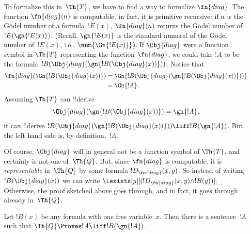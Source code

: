 \documentclass[../../../include/open-logic-section]{subfiles}
\begin{document}
\begin{explain}
To formalize this in~$\Th{T}$, we have to find a way to formalize
$\fn{diag}$. The function $\fn{diag}(n)$ is computable, in fact, it is
primitive recursive: if $n$ is the G\"odel number of a
formula~$!E(x)$, $\fn{diag}(n)$ returns the G\"odel number
of~$!E(\gn{!E(x)})$. (Recall, $\gn{!E(x)}$ is the standard numeral of
the G\"odel number of~$!E(x)$, i.e., $\num{\Gn{!E(x)}}$). If
$\Obj{diag}$ were a function symbol in $\Th{T}$ representing the
function $\fn{diag}$, we could take $!A$ to be the formula
$!B(\Obj{diag}(\gn{!B(\Obj{diag}(x))}))$. Notice that
\begin{align*}
\fn{diag}(\Gn{!B(\Obj{diag}(x))}) & = 
\Gn{!B(\Obj{diag}(\gn{!B(\Obj{diag}(x))}))} \\
& = \Gn{!A}.
\end{align*}
Assuming $\Th{T}$ can !!{derive}
\[
\Obj{diag}(\gn{!B(\Obj{diag}(x))}) = \gn{!A},
\]
it can !!{derive} $!B(\Obj{diag}(\gn{!B(\Obj{diag}(x))}))
\liff !B(\gn{!A})$. But the left hand side is, by
definition,~$!A$.

Of course, $\Obj{diag}$ will in general not be a function symbol of
$\Th{T}$, and certainly is not one of~$\Th{Q}$. But, since $\fn{diag}$
is computable, it is \emph{representable} in~$\Th{Q}$ by some formula
$!D_{\fn{diag}}(x,y)$. So instead of writing $!B(\Obj{diag}(x))$ we
can write $\lexists[y][(!D_{\fn{diag}}(x,y) \land !B(y))]$. Otherwise,
the proof sketched above goes through, and in fact, it goes through
already in~$\Th{Q}$.
\end{explain}

\begin{lem}
 Let $!B(x)$ be any formula with one free
variable~$x$. Then there is a sentence~$!A$ such that $\Th{Q} \Proves
!A \liff !B(\gn{!A})$.
\end{lem}
\end{document}
